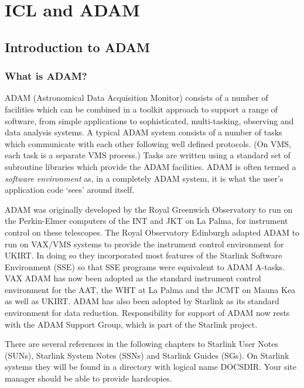 \documentclass[twoside,11pt]{report}
\newcommand{\stardocinitials}  {SG}
\newcommand{\stardocnumber}    {5.2}
\newcommand{\stardocname}{\stardocinitials /\stardocnumber}
\newcommand{\xlabel}[1]{}
\begin{document}
\cleardoublepage
\part{ICL and ADAM}
   \markboth{\stardocname}{\stardocname}

\chapter{\xlabel{introduction_to_adam}Introduction to ADAM}

\section{\xlabel{what_is_adam}What is ADAM?}

ADAM (Astronomical Data Acquisition Monitor) consists of a number of facilities
which can be combined in a toolkit approach to support a range of software,
from simple applications to sophisticated, multi-tasking, observing and data
analysis systems.
A typical ADAM system consists of a number of tasks which communicate with each
other following well defined protocols.
(On VMS, each task is a separate VMS process.)
Tasks are written using a standard set of subroutine libraries which provide
the ADAM facilities.
ADAM is often termed a {\em software environment} as, in a completely ADAM
system, it is what the user's application code `sees' around itself.

ADAM was originally developed by the Royal Greenwich Observatory to run on the
Perkin-Elmer computers of the INT and JKT on La Palma, for instrument
control on these telescopes. The Royal Observatory
Edinburgh adapted ADAM to run on VAX/VMS systems to provide the
instrument control environment for UKIRT. In doing so they incorporated
most features of the Starlink Software Environment (SSE) so that SSE programs
were equivalent to ADAM A-tasks. VAX ADAM has now been adopted as the
standard instrument control environment for the AAT, the WHT at La Palma
and the JCMT on Mauna Kea as well as UKIRT. ADAM has also been adopted
by Starlink as its standard environment for data reduction.
Responsibility for support of ADAM now rests with the ADAM Support Group,
which is part of the Starlink project.

There are several references in the following chapters to Starlink User Notes
(SUNs), Starlink System Notes (SSNs) and Starlink Guides (SGs).
On Starlink systems they will be found in a directory with logical name
DOCSDIR. Your site manager should be able to provide hardcopies.
\end{document}
